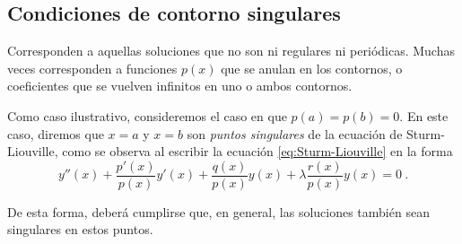\subsection{Condiciones de contorno singulares}

Corresponden a aquellas soluciones que no son ni regulares ni periódicas. Muchas veces corresponden a funciones $p(x)$ que se anulan en los contornos, o coeficientes que se vuelven infinitos en uno o ambos contornos.

Como caso ilustrativo, consideremos el caso en que $p(a) = p(b) = 0$. En este caso, diremos que $x=a$ y $x=b$ son \emph{puntos singulares} de la ecuación de Sturm-Liouville, como se observa al escribir la ecuación \eqref{eq:Sturm-Liouville} en la forma
\begin{equation}
    y''(x) + \frac{p'(x)}{p(x)} y'(x) + \frac{q(x)}{p(x)} y(x) + \lambda \frac{r(x)}{p(x)} y(x) = 0 \ .
\end{equation}

De esta forma, deberá cumplirse que, en general, las soluciones también sean singulares en estos puntos.